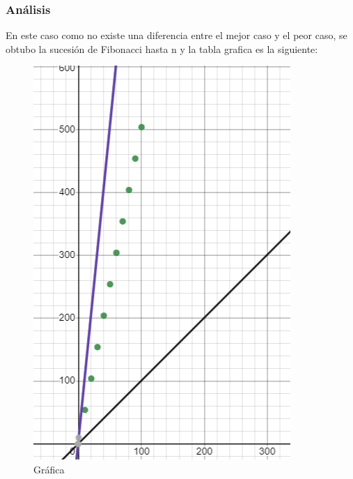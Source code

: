 \documentclass[12pt,twoside]{article}
\begin{document}
\subsubsection{Análisis}
En este caso como no existe una diferencia entre el mejor caso y el peor caso, se obtubo la sucesión de Fibonacci hasta n y la tabla grafica es la siguiente:
\begin{figure}[h!]
\centering
\includegraphics[scale=0.5]{graffiboas.png}
\caption{Gráfica}
\label{fig:universe}
\end{figure}
\clearpage
\end{document}
